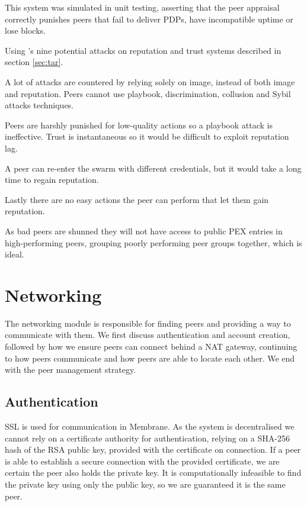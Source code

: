 \documentclass[11pt, a4paper, twocolumn, twoside]{report}
\begin{document}
This system was simulated in unit testing, asserting that the peer appraisal correctly punishes peers that fail to deliver PDPs, have incompatible uptime or lose blocks.

Using \cite{josang2009challenges}'s nine potential attacks on reputation and trust systems described in section \ref{sec:tar}.

A lot of attacks are countered by relying solely on image, instead of both image and reputation. Peers cannot use playbook, discrimination, collusion and Sybil attacks techniques. 

Peers are harshly punished for low-quality actions so a playbook attack is ineffective. Trust is instantaneous so it would be difficult to exploit reputation lag. 

A peer can re-enter the swarm with different credentials, but it would take a long time to regain reputation.

Lastly there are no easy actions the peer can perform that let them gain reputation.

As bad peers are shunned they will not have access to public PEX entries in high-performing peers, grouping poorly performing peer groups together, which is ideal.

\section{Networking}

The networking module is responsible for finding peers and providing a way to communicate with them. We first discuss authentication and account creation, followed by how we ensure peers can connect behind a NAT gateway, continuing to how peers communicate and how peers are able to locate each other. We end with the peer management strategy. 

\subsection{Authentication}

SSL is used for communication in Membrane. As the system is decentralised we cannot rely on a certificate authority for authentication, relying on a SHA-256 hash of the RSA public key, provided with the certificate on connection. If a peer is able to establish a secure connection with the provided certificate, we are certain the peer also holds the private key. \citep{menezes1996handbook} It is computationally infeasible to find the private key using only the public key, so we are guaranteed it is the same peer.
\end{document}
